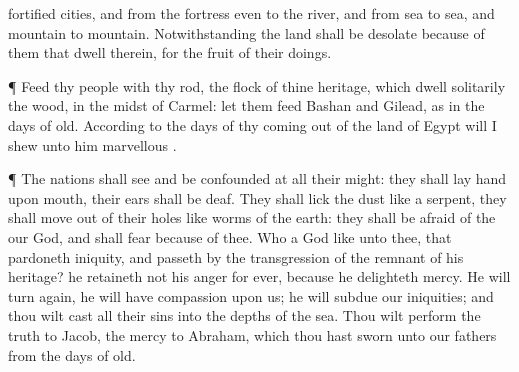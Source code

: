 {fortified
cities, and from the
fortress even to the
river, and from
sea to
sea, and
{}
mountain to
mountain.
Notwithstanding the
land shall be
desolate because of them that
dwell therein, for the
fruit of their
doings.
\par }{\PP {}¶
Feed thy
people with thy
rod, the
flock of thine
heritage, which
dwell
solitarily
{} the
wood, in the
midst of
Carmel: let them
feed
{}
Bashan and
Gilead, as in the
days of
old.
According to the
days of thy
coming out of the
land of
Egypt will I
shew unto him
marvellous
{}.
\par }{\PP {}¶ The
nations shall
see and be
confounded at all their
might: they shall
lay
{}
hand upon
{}
mouth, their
ears shall be
deaf.
They shall
lick the
dust like a
serpent, they shall
move out of their
holes like
worms of the
earth: they shall be
afraid of the
{} our
God, and shall
fear because of thee.
Who
{} a
God like unto thee, that
pardoneth
iniquity, and passeth
by the
transgression of the
remnant of his
heritage? he
retaineth not his
anger for
ever, because he
delighteth
{}
mercy.
He will turn
again, he will have
compassion upon us; he will
subdue our
iniquities; and thou wilt
cast all their
sins into the
depths of the
sea.
Thou wilt
perform the
truth to
Jacob,
{} the
mercy to
Abraham, which thou hast
sworn unto our
fathers from the
days of
old.
\par }